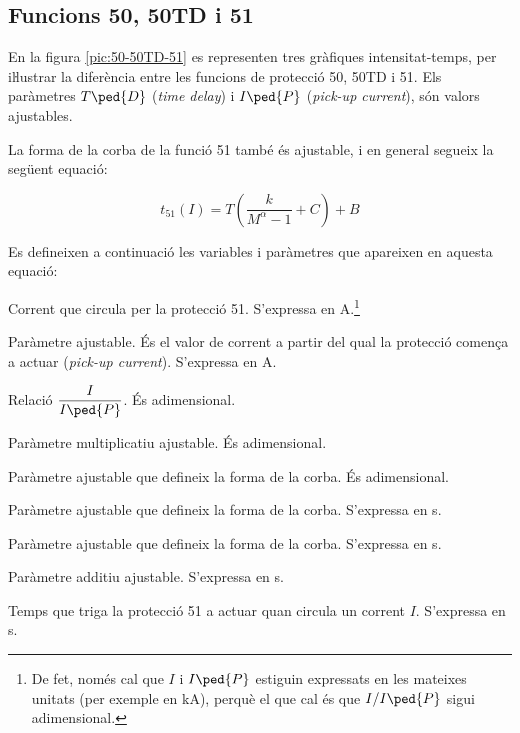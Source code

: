 \subsection{Funcions 50, 50TD i 51}

En la figura \vref{pic:50-50TD-51} es representen tres gràfiques intensitat-temps, per iŀlustrar la diferència entre les funcions de protecció 50, 50TD i 51. Els paràmetres $T\ped{D}$ (\textit{time delay}) i $I\ped{P}$ (\textit{pick-up current}), són valors ajustables.
\begin{center}
	
	\label{pic:50-50TD-51}
\end{center}

\break
La forma de la corba de la funció 51 també és ajustable, i en general segueix la següent equació:

\begin{equation}\label{eq:corba-50-51}
	t_{51}(I) = T \left( \frac{k}{M^\alpha -1} + C \right) + B
\end{equation}

Es defineixen a continuació les variables i paràmetres que apareixen en aquesta equació:
\begin{list}{}
	{\setlength{\labelwidth}{15mm} \setlength{\leftmargin}{15mm} \setlength{\labelsep}{5mm}}
	\item[$I$] Corrent que circula per la protecció 51. S'expressa en A.\footnote{\label{fn:I-Ip}De fet, només cal que $I$ i $I\ped{P}$ estiguin expressats en les mateixes unitats (per exemple en kA), perquè el  que cal és que  $I/I\ped{P}$ sigui adimensional.}
	\item[$I\ped{P}$] Paràmetre ajustable. És el valor de corrent a partir del qual la  protecció comença a actuar (\textit{pick-up current}). S'expressa en A.
    \item[$M$] Relació $\dfrac{I}{I\ped{P}}$. És adimensional.
	\item[$T$] Paràmetre multiplicatiu ajustable. És adimensional.
	\item[$\alpha$] Paràmetre ajustable que defineix la forma de la corba. És adimensional.
	\item[$k$] Paràmetre ajustable que defineix la forma de la corba. S'expressa en s.
	\item[$C$] Paràmetre ajustable que defineix la forma de la corba. S'expressa en s.
	\item[$B$] Paràmetre additiu ajustable. S'expressa en s.
	\item[$t_{51}(I)$] Temps que triga la protecció 51 a actuar quan circula un corrent $I$. S'expressa en s.
\end{list}


